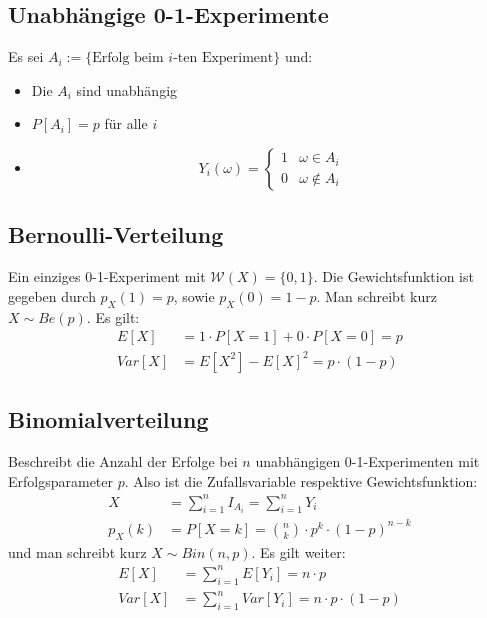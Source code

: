 \documentclass[8pt]{extarticle}
\newcommand{\W}{\mathcal{W}}
\newcommand{\Sn}{\sum_{i = 1}^n}
\begin{document}
\begin{multicols*}{3}
  \subsection*{Unabhängige 0-1-Experimente}
  Es sei $A_i := \{\text{Erfolg beim $i$-ten Experiment}\}$
  und:
  \begin{itemize}
    \item Die $A_i$ sind unabhängig
    \item $P[A_i] = p$ für alle $i$
    \item $$
            Y_i(\omega) =
            \begin{cases}
              1 & \omega \in A_i      \\
              0 & \omega \not \in A_i
            \end{cases}
          $$
  \end{itemize}
  \subsection*{Bernoulli-Verteilung}
  Ein einziges 0-1-Experiment mit $\W(X) = \{0, 1\}$. Die
  Gewichtsfunktion ist gegeben durch $p_X(1) = p$,
  sowie $p_X(0) = 1-p$.
  Man schreibt kurz $X \sim Be(p)$. Es gilt:
  \begin{align*}
    E[X]   & = 1 \cdot P[X = 1] + 0 \cdot P[X = 0] = p \\
    Var[X] & = E[X^2] - E[X]^2 = p \cdot (1-p)
  \end{align*}
  \subsection*{Binomialverteilung}
  Beschreibt die Anzahl der Erfolge bei $n$ unabhängigen
  0-1-Experimenten mit Erfolgsparameter $p$. Also ist die
  Zufallsvariable respektive Gewichtsfunktion:
  \begin{align*}
    X      & = \Sn I_{A_i} = \Sn Y_i                               \\
    p_X(k) & = P[X = k] = \binom{n}{k} \cdot p^k \cdot (1-p)^{n-k}
  \end{align*}
  und man schreibt kurz $X \sim Bin(n, p)$. Es gilt weiter:
  \begin{align*}
    E[X]   & = \Sn E[Y_i] = n \cdot p               \\
    Var[X] & = \Sn Var[Y_i] = n \cdot p \cdot (1-p)
  \end{align*}

\end{multicols*}
\end{document}
